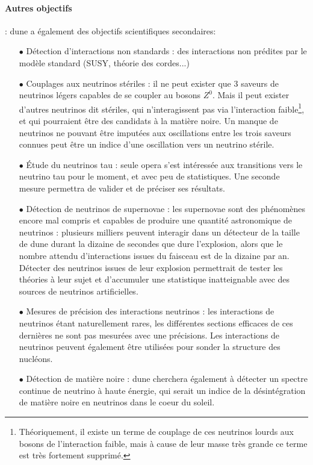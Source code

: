       \paragraph{Autres objectifs} : \gls{dune} a également des objectifs scientifiques secondaires:
      \begin{itemize}
        \item[$\bullet$] Détection d'interactions non standards : des interactions non prédites par le modèle standard (SUSY, théorie des cordes...)
        \item[$\bullet$] Couplages aux neutrinos stériles : il ne peut exister que 3 saveurs de neutrinos légers capables de se coupler au bosons $Z^0$\cite{Olive2016}. Mais il peut exister d'autres neutrinos dit stériles, qui n'interagissent pas via l'interaction faible\footnote{Théoriquement, il existe un terme de couplage de ces neutrinos lourds aux bosons de l'interaction faible, mais à cause de leur masse très grande ce terme est très fortement supprimé.}, et qui pourraient être des candidats à la matière noire. Un manque de neutrinos ne pouvant être imputées aux oscillations entre les trois saveurs connues peut être un indice d'une oscillation vers un neutrino stérile.
        \item[$\bullet$] Étude du neutrinos tau : seule \gls{opera} s'est intéressée aux transitions vers le neutrino tau pour le moment, et avec peu de statistiques. Une seconde mesure permettra de valider et de préciser ses résultats.
        \item[$\bullet$] Détection de neutrinos de supernovae : les supernovae sont des phénomènes encore mal compris et capables de produire une quantité astronomique de neutrinos : plusieurs milliers peuvent interagir dans un détecteur de la taille de \gls{dune} durant la dizaine de secondes que dure l'explosion, alors que le nombre attendu d'interactions issues du faisceau est de la dizaine par an. Détecter des neutrinos issues de leur explosion permettrait de tester les théories à leur sujet et d'accumuler une statistique inatteignable avec des sources de neutrinos artificielles.
        \item[$\bullet$] Mesures de précision des interactions neutrinos : les interactions de neutrinos étant naturellement rares, les différentes sections efficaces de ces dernières ne sont pas mesurées avec une précisions. Les interactions de neutrinos peuvent également être utilisées pour sonder la structure des nucléons.
        \item[$\bullet$] Détection de matière noire : \gls{dune} cherchera également à détecter un spectre continue de neutrino à haute énergie, qui serait un indice de la désintégration de matière noire en neutrinos dans le coeur du soleil\cite{Rott2017}. 
      \end{itemize}

